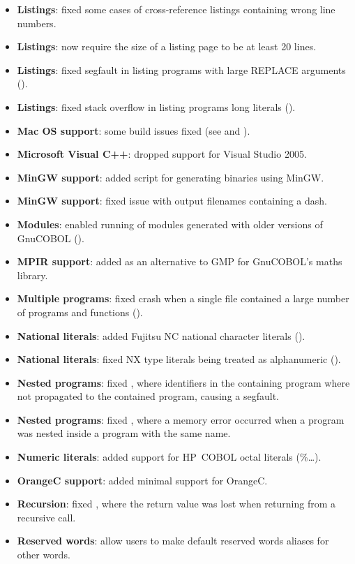 \begin{itemize}
\item \textbf{Listings}: fixed some cases of cross-reference listings containing wrong line numbers.
\item \textbf{Listings}: now require the size of a listing page to be at least 20 lines.
\item \textbf{Listings}: fixed segfault in listing programs with large REPLACE arguments ().
\item \textbf{Listings}: fixed stack overflow in listing programs long literals ().
\item \textbf{Mac OS support}: some build issues fixed (see  and ).
\item \textbf{Microsoft Visual C++}: dropped support for Visual Studio 2005.
\item \textbf{MinGW support}: added script for generating binaries using MinGW.
\item \textbf{MinGW support}: fixed issue with output filenames containing a dash.
\item \textbf{Modules}: enabled running of modules generated with older versions of GnuCOBOL ().
\item \textbf{MPIR support}: added as an alternative to GMP for GnuCOBOL's maths library.
\item \textbf{Multiple programs}: fixed crash when a single file contained a large number of programs and functions ().
\item \textbf{National literals}: added Fujitsu NC national character literals ().
\item \textbf{National literals}: fixed NX type literals being treated as alphanumeric ().
\item \textbf{Nested programs}: fixed , where identifiers in the containing program where not propagated to the contained program, causing a segfault.
\item \textbf{Nested programs}: fixed , where a memory error occurred when a program was nested inside a program with the same name.
\item \textbf{Numeric literals}: added support for HP~COBOL octal literals (\%\ldots).
\item \textbf{OrangeC support}: added minimal support for OrangeC.
\item \textbf{Recursion}: fixed , where the return value was lost when returning from a recursive call.
\item \textbf{Reserved words}: allow users to make default reserved words aliases for other words.

\end{itemize}
